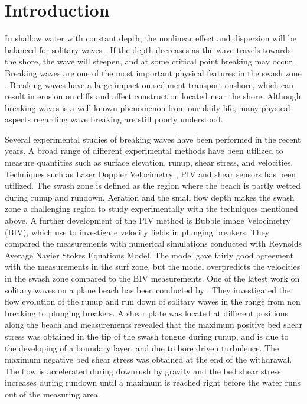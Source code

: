 \documentclass[review, authoryear]{elsarticle}
\begin{document}
\section{Introduction}
In shallow water with constant depth, the nonlinear effect and dispersion will be balanced for solitary waves \citep{peregrine1983breaking}. If the depth decreases as the wave travels towards the shore, the wave will steepen, and at some critical  point breaking may occur. Breaking waves are one of the most important physical features in the swash zone \citep{elfrink2002hydrodynamics}. Breaking waves have a large impact on sediment transport onshore, which can result in erosion on cliffs and affect construction located near the shore. Although breaking waves is a well-known phenomenon from our daily life, many physical aspects regarding wave breaking are still poorly understood.







 Several experimental studies of breaking waves have been performed in the recent years. A broad range of different experimental methods have been utilized to measure quantities such as surface elevation, runup, shear stress, and velocities. Techniques such as Laser Doppler Velocimetry \citep{petti01}, PIV \citep{cowen03} and shear sensors \citep{Barnes09}  has been utilized. The swash zone is defined as the region where the beach is partly wetted during runup and rundown. Aeration and the 
small flow depth makes the swash zone a challenging region to study experimentally with the techniques mentioned above. A further development of the PIV method is Bubble image Velocimetry (BIV), which \cite{rivillas2012estimation} use to investigate velocity fields in plunging breakers. They compared the measurements with numerical simulations conducted with Reynolds Average Navier Stokes Equations Model. The   model gave fairly good agreement with the measurements in the surf zone, but the model overpredicts the velocities in the swash zone compared to the BIV measurements. One of the latest work on solitary waves on a plane beach has been conducted by \cite{pujara2015experimental}. They investigated the flow evolution of the runup and run down of solitary waves in the range from non breaking to plunging breakers. A shear plate was located at different positions along the beach and measurements revealed that the maximum positive bed shear stress was obtained in the tip of the swash tongue during runup,  and is due to the developing of a boundary layer, and due to bore driven turbulence. The maximum negative bed shear stress was obtained at the end of the withdrawal. The flow is accelerated during downrush by gravity and the bed shear stress increases during rundown until a maximum is reached right before the water runs out of the measuring area.
\end{document}
